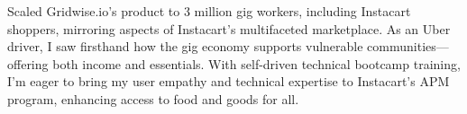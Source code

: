 
{

    Scaled Gridwise.io’s product to 3 million gig workers, including Instacart shoppers, mirroring aspects of Instacart’s multifaceted marketplace. As an Uber driver, I saw firsthand how the gig economy supports vulnerable communities—offering both income and essentials. With self-driven technical bootcamp training, I’m eager to bring my user empathy and technical expertise to Instacart’s APM program, enhancing access to food and goods for all.
}
